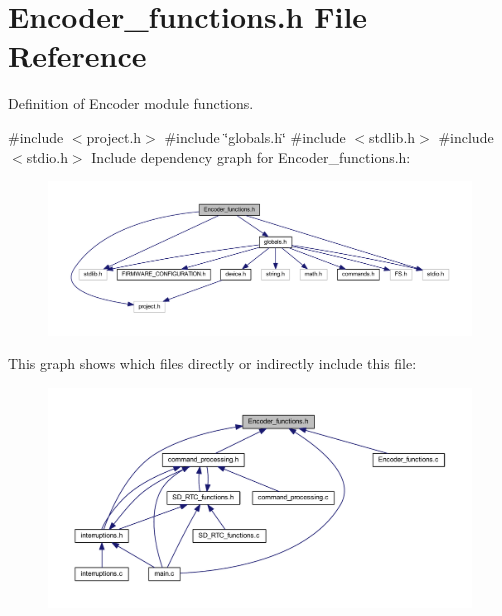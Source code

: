 \section{Encoder\+\_\+functions.\+h File Reference}
\label{_encoder__functions_8h}


Definition of Encoder module functions.  


{\ttfamily \#include $<$project.\+h$>$}\newline
{\ttfamily \#include \char`\"{}globals.\+h\char`\"{}}\newline
{\ttfamily \#include $<$stdlib.\+h$>$}\newline
{\ttfamily \#include $<$stdio.\+h$>$}\newline
Include dependency graph for Encoder\+\_\+functions.\+h\+:\nopagebreak
\begin{figure}[H]
\begin{center}
\leavevmode
\includegraphics[width=350pt]{_encoder__functions_8h__incl}
\end{center}
\end{figure}
This graph shows which files directly or indirectly include this file\+:\nopagebreak
\begin{figure}[H]
\begin{center}
\leavevmode
\includegraphics[width=350pt]{_encoder__functions_8h__dep__incl}
\end{center}
\end{figure}
